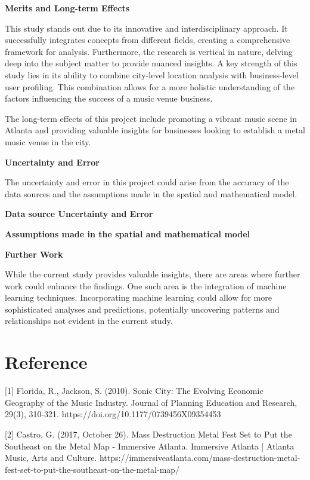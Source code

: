 \documentclass[11pt]{article}
\begin{document}
\textbf{Merits and Long-term Effects}

This study stands out due to its innovative and interdisciplinary approach. It successfully integrates concepts from different fields, creating a comprehensive framework for analysis. Furthermore, the research is vertical in nature, delving deep into the subject matter to provide nuanced insights. A key strength of this study lies in its ability to combine city-level location analysis with business-level user profiling. This combination allows for a more holistic understanding of the factors influencing the success of a music venue business.

The long-term effects of this project include promoting a vibrant music scene in Atlanta and providing valuable insights for businesses looking to establish a metal music venue in the city.

\textbf{Uncertainty and Error}

The uncertainty and error in this project could arise from the accuracy of the data sources and the assumptions made in the spatial and mathematical model.

\textbf{Data source Uncertainty and Error}

\textbf{Assumptions made in the spatial and mathematical model}


\textbf{Further Work}

While the current study provides valuable insights, there are areas where further work could enhance the findings. One such area is the integration of machine learning techniques. Incorporating machine learning could allow for more sophisticated analyses and predictions, potentially uncovering patterns and relationships not evident in the current study.



\newpage

\section{Reference}

{[}1{]} Florida, R., Jackson, S. (2010). Sonic City: The Evolving Economic Geography of the Music Industry. Journal of Planning Education and Research, 29(3), 310-321. https://doi.org/10.1177/0739456X09354453

{[}2{]} Castro, G. (2017, October 26). Mass Destruction Metal Fest Set to Put the Southeast on the Metal Map - Immersive Atlanta. Immersive Atlanta | Atlanta Music, Arts and Culture. https://immersiveatlanta.com/mass-destruction-metal-fest-set-to-put-the-southeast-on-the-metal-map/
\end{document}
